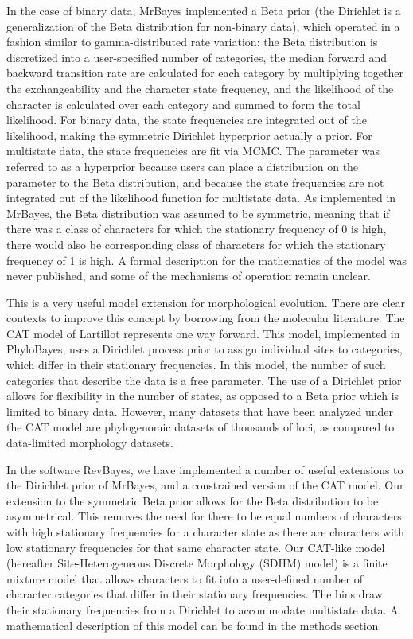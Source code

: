 \documentclass[]{sysbio}
\begin{document}
In the case of binary data, MrBayes implemented a Beta prior (the Dirichlet is a generalization of the Beta distribution for non-binary data), which operated in a fashion similar to gamma-distributed rate variation: the Beta distribution is discretized into a user-specified number of categories, the median forward and backward transition rate are calculated for each category by multiplying together the exchangeability and the character state frequency, and the likelihood of the character is calculated over each category and summed to form the total likelihood. 
For binary data, the state frequencies are integrated out of the likelihood, making the symmetric Dirichlet hyperprior actually a prior.
For multistate data, the state frequencies are fit via MCMC.
The parameter was referred to as a hyperprior because users can place a distribution on the parameter to the Beta distribution, and because the state frequencies are not integrated out of the likelihood function for multistate data. 
As implemented in MrBayes, the Beta distribution was assumed to be symmetric, meaning that if there was a class of characters for which the stationary frequency of 0 is high, there would also be corresponding class of characters for which the stationary frequency of 1 is high.
A formal description for the mathematics of the model was never published, and some of the mechanisms of operation remain unclear. 
\par
This is a very useful model extension for morphological evolution.
There are clear contexts to improve this concept by borrowing from the molecular literature.
The CAT model of Lartillot represents one way forward. 
This model, implemented in PhyloBayes, uses a Dirichlet process prior to assign individual sites to categories, which differ in their stationary frequencies. 
In this model, the number of such categories that describe the data is a free parameter. 
The use of a Dirichlet prior allows for flexibility in the number of states, as opposed to a Beta prior which is limited to binary data.
However, many datasets that have been analyzed under the CAT model are phylogenomic datasets of thousands of loci, as compared to data-limited morphology datasets.\par
In the software RevBayes, we have implemented a number of useful extensions to the Dirichlet prior of MrBayes, and a constrained version of the CAT model. 
Our extension to the symmetric Beta prior allows for the Beta distribution to be asymmetrical.
This removes the need for there to be equal numbers of characters with high stationary frequencies for a character state as there are characters with low stationary frequencies for that same character state.
Our CAT-like model (hereafter Site-Heterogeneous Discrete Morphology (SDHM) model) is a finite mixture model that allows characters to fit into a user-defined number of character categories that differ in their stationary frequencies. 
The bins draw their stationary frequencies from a Dirichlet to accommodate multistate data. 
A mathematical description of this model can be found in the methods section. \par
\end{document}
